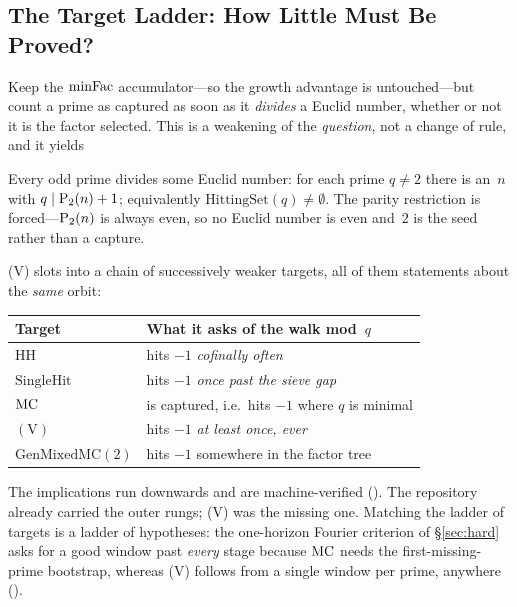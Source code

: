\subsection{The Target Ladder: How Little Must Be Proved?}
\label{sec:target-ladder}

Keep the $\mathrm{minFac}$ accumulator---so the growth advantage is
untouched---but count a prime as captured as soon as it \emph{divides}
a Euclid number, whether or not it is the factor selected.  This is a
weakening of the \emph{question}, not a change of rule, and it yields

\begin{definition}
\label{def:V}
Every odd prime divides some Euclid number: for each prime $q \neq 2$
there is an~$n$ with $q \mid \mathrm{P}_{2}(n)+1$; equivalently
$\mathrm{HittingSet}(q) \neq \emptyset$.  The parity restriction is
forced---$\mathrm{P}_{2}(n)$ is always even, so no Euclid number is even
and~$2$ is the seed rather than a capture.
\end{definition}

\noindent
(V) slots into a chain of successively weaker targets, all of them
statements about the \emph{same} orbit:

\smallskip
\begin{center}
\begin{tabular}{@{}l@{\quad}l@{}}
\toprule
\textbf{Target} & \textbf{What it asks of the walk mod~$q$} \\
\midrule
$\mathrm{HH}$ & hits $-1$ \emph{cofinally often} \\
$\mathrm{SingleHit}$ & hits $-1$ \emph{once past the sieve gap} \\
$\mathrm{MC}$ & is captured, i.e.\ hits $-1$ where $q$ is minimal \\
$(\mathrm{V})$ & hits $-1$ \emph{at least once, ever} \\
$\mathrm{GenMixedMC}(2)$ & hits $-1$ somewhere in the factor tree \\
\bottomrule
\end{tabular}
\end{center}

\smallskip\noindent
The implications run downwards and are machine-verified
().  The
repository already carried the outer rungs; (V) was the missing one.
Matching the ladder of targets is a ladder of hypotheses: the
one-horizon Fourier criterion of \S\ref{sec:hard} asks for a good
window past \emph{every} stage because $\mathrm{MC}$ needs the
first-missing-prime bootstrap, whereas (V) follows from a single window
per prime, anywhere
().

